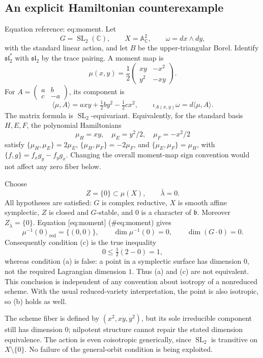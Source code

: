 \documentclass[10pt]{article}
\begin{document}
\subsection*{An explicit Hamiltonian counterexample}
Equation reference: eq:moment. Let \[G=\operatorname{SL}_2(\mathbb C),\qquad
 X=\mathbb A^2_{\mathbb C},\qquad
 \omega=dx\wedge dy,\] with the standard linear action, and let \(B\) be the upper-triangular Borel. Identify \(\mathfrak{sl}_2^*\) with \(\mathfrak{sl}_2\) by the trace pairing. A moment map is \[\mu(x,y)=\frac12
 \begin{pmatrix}xy&-x^2\\y^2&-xy\end{pmatrix}.
 \] For \(A=\left(\begin{smallmatrix}a&b\\c&-a\end{smallmatrix}\right)\), its component is \[\langle\mu,A\rangle=axy+\tfrac12by^2-\tfrac12cx^2,\qquad
 \iota_{A(x,y)}\omega=d\langle\mu,A\rangle .\] The matrix formula is \(\operatorname{SL}_2\)-equivariant. Equivalently, for the standard basis \(H,E,F\), the polynomial Hamiltonians \[\mu_H=xy,\quad \mu_E=y^2/2,\quad \mu_F=-x^2/2\] satisfy \(\{\mu_H,\mu_E\}=2\mu_E\), \(\{\mu_H,\mu_F\}=-2\mu_F\), and \(\{\mu_E,\mu_F\}=\mu_H\), with \(\{f,g\}=f_xg_y-f_yg_x\). Changing the overall moment-map sign convention would not affect any zero fiber below.\par
Choose \[Z=\{0\}\subset\mu(X),\qquad \bar\lambda=0.\] All hypotheses are satisfied: \(G\) is complex reductive, \(X\) is smooth affine symplectic, \(Z\) is closed and \(G\)-stable, and \(0\) is a character of \(\mathfrak b\). Moreover \(Z_{\bar\lambda}=\{0\}\). Equation [eq:moment] (\#eq:moment) gives \[\mu^{-1}(0)_{\mathrm{red}}=\{(0,0)\},\qquad
 \dim\mu^{-1}(0)=0,\qquad \dim(G\cdot0)=0.\] Consequently condition (c) is the true inequality \[0\leq\tfrac12(2-0)=1,\] whereas condition (a) is false: a point in a symplectic surface has dimension \(0\), not the required Lagrangian dimension \(1\). Thus (a) and (c) are not equivalent. This conclusion is independent of any convention about isotropy of a nonreduced scheme. With the usual reduced-variety interpretation, the point is also isotropic, so (b) holds as well.\par
The scheme fiber is defined by \((x^2,xy,y^2)\), but its sole irreducible component still has dimension \(0\); nilpotent structure cannot repair the stated dimension equivalence. The action is even coisotropic generically, since \(\operatorname{SL}_2\) is transitive on \(X\setminus\{0\}\). No failure of the general-orbit condition is being exploited.\par
\end{document}
